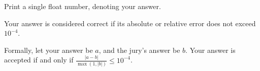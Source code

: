 Print a single float number, denoting your answer.

Your answer is considered correct if its absolute or relative error does not exceed $10^{-4}$.


Formally, let your answer be $a$, and the jury's answer be $b$. Your answer is accepted if and only if $\frac{|a - b|}{\max{(1, |b|)}} \le 10^{-4}$.

